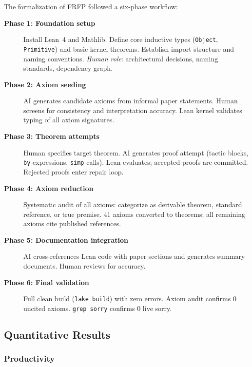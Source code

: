 The formalization of FRFP followed a six-phase workflow:

\begin{description}
  \item[\textbf{Phase 1: Foundation setup}]
        Install Lean~4 and Mathlib. Define core inductive types (\texttt{Object},
        \texttt{Primitive}) and basic kernel theorems. Establish import structure
        and naming conventions.
        \emph{Human role}: architectural decisions, naming standards, dependency
        graph.

  \item[\textbf{Phase 2: Axiom seeding}]
        AI generates candidate axioms from informal paper statements. Human
        screens for consistency and interpretation accuracy. Lean kernel validates
        typing of all axiom signatures.

  \item[\textbf{Phase 3: Theorem attempts}]
        Human specifies target theorem. AI generates proof attempt (tactic blocks,
        \texttt{by} expressions, \texttt{simp} calls). Lean evaluates; accepted
        proofs are committed. Rejected proofs enter repair loop.

  \item[\textbf{Phase 4: Axiom reduction}]
        Systematic audit of all axioms: categorize as derivable theorem, standard
        reference, or true premise. 41 axioms converted to theorems; all remaining
        axioms cite published references.

  \item[\textbf{Phase 5: Documentation integration}]
        AI cross-references Lean code with paper sections and generates summary
        documents. Human reviews for accuracy.

  \item[\textbf{Phase 6: Final validation}]
        Full clean build (\texttt{lake build}) with zero errors. Axiom audit
        confirms 0 uncited axioms. \texttt{grep sorry} confirms 0 live sorry.
\end{description}

\subsection{Quantitative Results}

\subsubsection*{Productivity}


